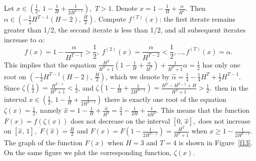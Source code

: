 \documentclass[12pt,a4paper]{amsart}
\begin{document}
Let $x \in \left( \frac12,\, 1-\frac{1}{H}+\frac{1}{2 H^{T-1}}  \right),$ $T>1.$ Denote $x = 1 - \frac{1}{H} + \frac{\alpha}{H^T}.$
Then $\alpha \in \left( -\frac12 H^{T-1} (H-2),\, \frac{H}{2} \right).$ Compute $f^{(T)}(x)$: the first iterate remains greater than 1/2, the second iterate is less than 1/2, and all subsequent iterates increase to $\alpha$: 
$$f(x) = 1 - \frac{\alpha}{H^{T-1}}>\frac12, \;
f^{(2)}(x) = \frac{\alpha}{H^{T-2}}<\frac12, \ldots , f^{(T)}(x)=\alpha.$$
This implies that the equation 
$\frac{H^T}{H^T+1} \left( 1-\frac{1}{H}+\frac{\alpha}{H^T} \right) + \frac{1}{H^T+1} \alpha = \frac12$ 
has only one root on $\left( -\frac12 H^{T-1} (H-2),\, \frac{H}{2} \right)$, which we denote by  $\widehat{\alpha} = \frac14 - \frac14 H^T + \frac12 H^{T-1}.$
Since $\zeta \left(\frac12\right) = \frac{H^{T-1}}{H^T+1} < \frac12$, and  
$\zeta \left( 1 - \frac{1}{H} + \frac{1}{2 H^{T-1}} \right) = \frac{H^T - H^{T-1} + H}{H^T +1} > \frac12,$ then in the interval 
$x \in \left( \frac12,\, 1-\frac{1}{H}+\frac{1}{2 H^{T-1}}  \right)$ there is exactly one root of the equation $\zeta (x) = \frac12$, namely
$\hat{x} = 1 - \frac{1}{H} + \frac{\widehat{\alpha}}{H^T} = \frac34 - \frac{1}{2H} + \frac{1}{4 H^T}.$ This means that the function 
$F(x)=f(\zeta(x))$ does not decrease on the interval $\left[0,\,\hat{x}\right],$ does not increase on $\left[\hat{x},\,1\right],$
$F(\hat{x})=\frac{H}{2}$ and $F(x) = F \left( 1 - \frac{1}{2 H^{T-1}} \right) = \frac{H^T}{H^T + 1}$ when 
$x \geq 1 - \frac{1}{2 H^{T-1}}.$ The graph of the function $F(x)$ when $H=3$ and $T=4$ is shown in Figure~\ref{f13}. On the same figure we plot the corresponding function,  $\zeta(x)$.
\end{document}
